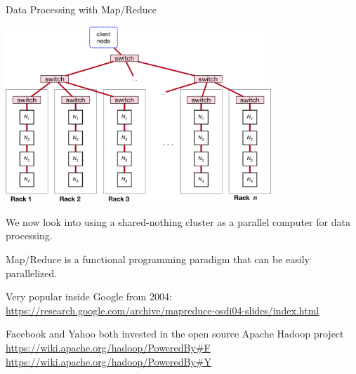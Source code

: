 


\def\myblue#1{\textcolor{blue}{#1}\xspace}
\def\myred#1{\textcolor{red}{#1}\xspace}

%
%


\begin{frame}{Data Processing with Map/Reduce}

\begin{center}
\includegraphics[width=0.75\textwidth]{figures/map_reduce_racks.eps}
\end{center}

We now look into using a shared-nothing cluster as a parallel computer for data processing.
\end{frame}

%
%


\begin{frame}

Map/Reduce is a functional programming paradigm that can be easily parallelized.

Very popular inside Google from 2004:
{\footnotesize\url{https://research.google.com/archive/mapreduce-osdi04-slides/index.html}}

Facebook and Yahoo both invested in the open source Apache Hadoop project\\
{\footnotesize{\url{https://wiki.apache.org/hadoop/PoweredBy\#F}}}\\
{\footnotesize{\url{https://wiki.apache.org/hadoop/PoweredBy\#Y}}}\\

\end{frame}


